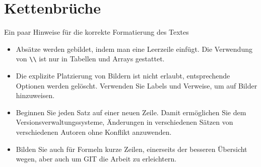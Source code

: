 %
%
%
\chapter{Kettenbrüche\label{chapter:kettenbruch}}
\begin{refsection}

Ein paar Hinweise für die korrekte Formatierung des Textes
\begin{itemize}
\item
Absätze werden gebildet, indem man eine Leerzeile einfügt.
Die Verwendung von \verb+\\+ ist nur in Tabellen und Arrays gestattet.
\item
Die explizite Platzierung von Bildern ist nicht erlaubt, entsprechende
Optionen werden gelöscht. 
Verwenden Sie Labels und Verweise, um auf Bilder hinzuweisen.
\item
Beginnen Sie jeden Satz auf einer neuen Zeile. 
Damit ermöglichen Sie dem Versionsverwaltungssysteme, Änderungen
in verschiedenen Sätzen von verschiedenen Autoren ohne Konflikt 
anzuwenden.
\item 
Bilden Sie auch für Formeln kurze Zeilen, einerseits der besseren
Übersicht wegen, aber auch um GIT die Arbeit zu erleichtern.
\end{itemize}






\printbibliography[heading=subbibliography]
\end{refsection}
